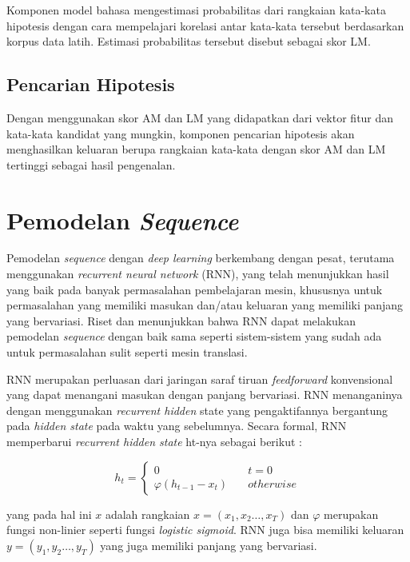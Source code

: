 Komponen model bahasa mengestimasi probabilitas dari rangkaian kata-kata hipotesis dengan cara mempelajari korelasi antar kata-kata tersebut berdasarkan korpus data latih. Estimasi probabilitas tersebut disebut sebagai skor LM.


\subsection{Pencarian Hipotesis}

Dengan menggunakan skor AM dan LM yang didapatkan dari vektor fitur dan kata-kata kandidat yang mungkin, komponen pencarian hipotesis akan menghasilkan keluaran berupa rangkaian kata-kata dengan skor AM dan LM tertinggi sebagai hasil pengenalan. 


\section{Pemodelan \textit{Sequence}}

Pemodelan \textit{sequence} dengan \textit{deep learning} berkembang dengan pesat, terutama menggunakan \textit{recurrent neural network} (RNN), yang telah menunjukkan hasil yang baik pada banyak permasalahan pembelajaran mesin, khususnya untuk permasalahan yang memiliki masukan dan/atau keluaran yang memiliki panjang yang bervariasi. Riset \textcite{Sutskever2014} dan \textcite{Bahdanau2015} menunjukkan bahwa RNN dapat melakukan pemodelan \textit{sequence} dengan baik sama seperti sistem-sistem yang sudah ada untuk permasalahan sulit seperti mesin translasi.
\bigskip

RNN merupakan perluasan dari jaringan saraf tiruan \textit{feedforward} konvensional yang dapat menangani masukan dengan panjang bervariasi. RNN menanganinya dengan menggunakan \textit{recurrent hidden} state yang pengaktifannya bergantung pada \textit{hidden state} pada waktu yang sebelumnya. Secara formal, RNN memperbarui \textit{recurrent hidden state} ht-nya sebagai berikut \parencite{Chung2014}:

\[ h_{t} =
  \begin{cases}
    0                           & \quad t=0 \\
    \varphi(h_{t-1} - x_{t})    & \quad otherwise
  \end{cases}
\]

yang pada hal ini \(x\) adalah rangkaian \(x=(x_{1},x_{2}\dots,x_{T})\) dan \(\varphi\) merupakan fungsi non-linier seperti fungsi \textit{logistic sigmoid}. RNN juga bisa memiliki keluaran \(y=(y_{1},y_{2}\dots,y_{T})\) yang juga memiliki panjang yang bervariasi.
\bigskip


